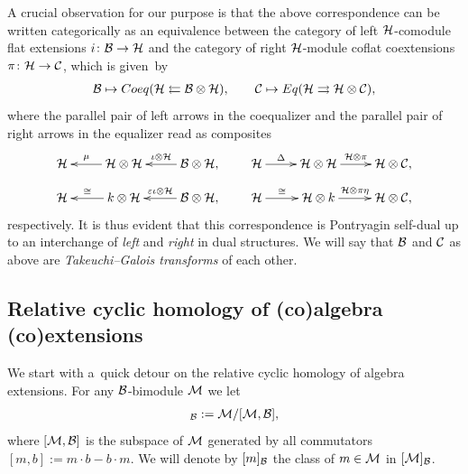 \documentclass[11pt]{article}
\numberwithin{equation}{section}
\begin{document}
A crucial observation for our purpose is that the above correspondence can be written categorically as an equivalence
between the category of left ${\cal H}$-comodule f\/lat extensions $i\colon {\cal B}\to{\cal H}$ and the category of right
${\cal H}$-module cof\/lat coextensions $\pi\colon {\cal H}\to {\cal C}$, which is given~by
\begin{gather*}%
{\cal B}\mapsto {\rm Coeq}({\cal H}\leftleftarrows {\cal B}\otimes{\cal H}),
\qquad
{\cal C}\mapsto {\rm Eq}({\cal H}\rightrightarrows {\cal H}\otimes{\cal C}),
\end{gather*}
where the parallel pair of left arrows in the coequalizer and the parallel pair of right arrows in the equalizer read as composites
\begin{gather*}
\xymatrix@R-1pc{{\cal H} & {\cal H}\otimes{\cal H}\ar[l]_-{\mu}& {\cal B}\otimes{\cal H}\ar[l]_-{\iota\otimes {\cal H}},
\\
{\cal H} & k\otimes {\cal H}\ar[l]_-{\cong} &{\cal B}\otimes{\cal H}\ar[l]_-{\varepsilon\iota\otimes {\cal H}},}\qquad
 \xymatrix@R-1pc{{\cal H}\ar[r]^-{\Delta} & {\cal H}\otimes{\cal H} \ar[r]^-{{\cal H}\otimes\pi} &{\cal H}\otimes{\cal C},
\\
{\cal H} \ar[r]^-{\cong} & {\cal H}\otimes k \ar[r]^-{{\cal H}\otimes \pi\eta} &{\cal H}\otimes{\cal C},}
\end{gather*}
respectively.
It is thus evident that this correspondence is Pontryagin self-dual up to an interchange of \emph{left} and \emph{right}
in dual structures.
We will say that ${\cal B}$ and ${\cal C}$ as above are \emph{Takeuchi--Galois transforms} of each other.

\subsection{Relative cyclic homology of (co)algebra (co)extensions}

We start with a~quick detour on the relative cyclic homology of algebra extensions.
For any ${\cal B}$-bimodule ${\cal M}$ we let
\begin{gather*}
[{\cal M}]_{\cal B}:={\cal M}/[{\cal M},{\cal B}],
\end{gather*}
where $[{\cal M},{\cal B}]$ is the subspace of ${\cal M}$ generated by all commutators $[m,b]:=m\cdot b-b\cdot m$.
We will denote by $[m]_{\cal B}$ the class of $m\in {\cal M}$ in $[{\cal M}]_{\cal B}$.
\end{document}
